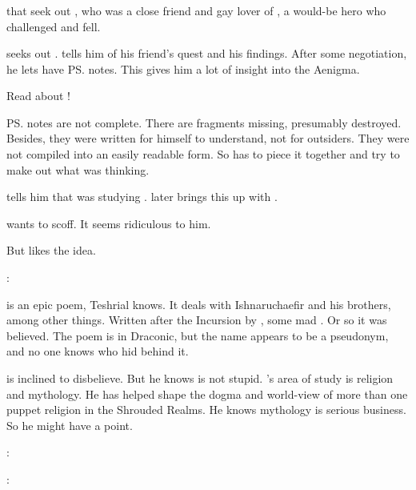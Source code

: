 \subsubsection{\Nemuragh}
\Menessiaraid{}  that \Teshrial{} seek out , who was a close friend and gay lover of \Lothagiel, a would-be hero who challenged \Ishnaruchaefir{} and fell. 

\Teshrial{} seeks out . 
\Nemuragh{} tells him of his friend's quest and his findings. 
After some negotiation, he lets \Teshrial{} have \ps{\Lothagiel} notes. 
This gives him a lot of insight into the Aenigma. 

Read about !

\ps{\Lothagiel} notes are not complete. 
There are fragments missing, presumably destroyed. 
Besides, they were written for himself to understand, not for outsiders. 
They were not compiled into an easily readable form. 
So \Teshrial{} has to piece it together and try to make out what \Lothagiel{} was thinking. 

\Nemuragh{} tells him that \Lothagiel{} was studying \WanderersInDarknessEmph. 
\Teshrial{} later brings this up with \Menessiaraid. 

\begin{prose}
  \Teshrial{} wants to scoff. 
  It seems ridiculous to him. 
  
  But \Menessiaraid{} likes the idea.
  
  \Teshrial: 
  
  
  \WanderersInDarkness is an epic poem, Teshrial knows.
  It deals with Ishnaruchaefir and his brothers, among other things. 
  Written after the Incursion by \Melcryth, some mad \dragon.
  Or so it was believed.
  The poem is in Draconic, but the name \quo{\Melcryth} appears to be a pseudonym, and no one knows who hid behind it. 
  
  \Teshrial{} is inclined to disbelieve. 
  But he knows \Menessiaraid{} is not stupid.
  \Menessiaraid{}'s area of study is religion and mythology.
  He has helped shape the dogma and world-view of more than one puppet religion in the Shrouded Realms.
  He knows mythology is serious business.
  So he might have a point.
  
  \Menessiaraid:
  
  \Teshrial: 
\end{prose}

